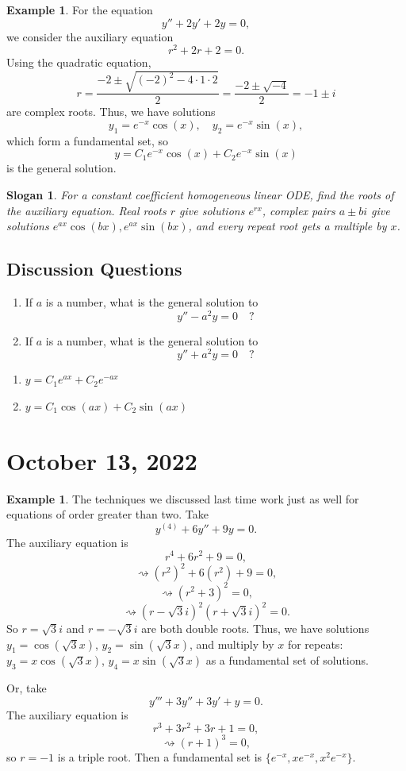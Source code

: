 \documentclass[12pt]{amsart}
\numberwithin{equation}{section}
\theoremstyle{plain} %
\newtheorem{slogan}[equation]{Slogan}
\newcommand{\Oct}[1]{\section{October #1, 2022}}
\newcommand{\rsa}{\rightsquigarrow}
\theoremstyle{definition}
\newtheorem{ex}[equation]{Example}
\theoremstyle{remark}
\begin{document}
\begin{ex}
For the equation
\[ y'' + 2y' +2y = 0,\]
we consider the auxiliary equation
\[ r^2 + 2r +2=0.\]
Using the quadratic equation,
\[ r = \frac{-2 \pm \sqrt{(-2)^2 - 4 \cdot 1 \cdot 2}}{2} = \frac{-2 \pm \sqrt{-4}}{2} = -1 \pm i\]
are complex roots. Thus, we have solutions 
\[ y_1 = e^{-x} \cos(x) , \quad y_2 = e^{-x} \sin(x),\]
which form a fundamental set, so
\[ y = C_1 e^{-x} \cos(x) + C_2 e^{-x} \sin(x)\]
is the general solution.
\end{ex}

\begin{slogan}
For a constant coefficient homogeneous linear ODE, find the roots of the auxiliary equation. Real roots $r$ give solutions $e^{rx}$, complex pairs $a\pm bi$ give solutions $e^{ax} \cos(bx) , e^{ax} \sin(bx)$, and every repeat root gets a multiple by $x$.
\end{slogan}


\subsection*{Discussion Questions}
\begin{enumerate}
\item If $a$ is a number, what is the general solution to
\[ y'' - a^2 y = 0\quad ?\]
\item If $a$ is a number, what is the general solution to
\[ y'' + a^2 y = 0\quad ?\]
\end{enumerate}
\begin{framed}
\begin{enumerate}
\item $y= C_1 e^{ax} + C_2 e^{-ax}$
\item $y= C_1 \cos(ax) + C_2 \sin(ax)$
\end{enumerate}
\end{framed}

\Oct{13}

\begin{ex} The techniques we discussed last time work just as well for equations of order greater than two. 
Take
\[ y^{(4)} + 6y'' + 9y = 0.\]
The auxiliary equation is 
\[ r^4 + 6 r^2 +9 = 0,\]
\[\rsa  (r^2)^2 + 6 (r^2) +9 = 0,\]
\[\rsa  (r^2 +3)^2 = 0,\]
\[\rsa  (r-\sqrt{3}i)^2(r+\sqrt{3}i)^2 = 0.\]
So $r=\sqrt{3} i $ and $r=-\sqrt{3}i$ are both double roots. Thus, we have
solutions $y_1= \cos(\sqrt{3} x)$, $y_2= \sin(\sqrt{3} x)$, and multiply by $x$ for repeats: $y_3= x \cos(\sqrt{3} x)$, $y_4= x \sin(\sqrt{3} x)$ as a fundamental set of solutions.

Or, take
\[ y''' + 3y'' + 3y' + y = 0.\]
The auxiliary equation is
\[ r^3 + 3r^2 + 3r + 1 = 0,\]
\[\rsa (r+1)^3 = 0,\]
so $r=-1$ is a triple root. Then a fundamental set is $\{ e^{-x}, x e^{-x}, x^2 e^{-x}\}$.
\end{ex}
\end{document}
